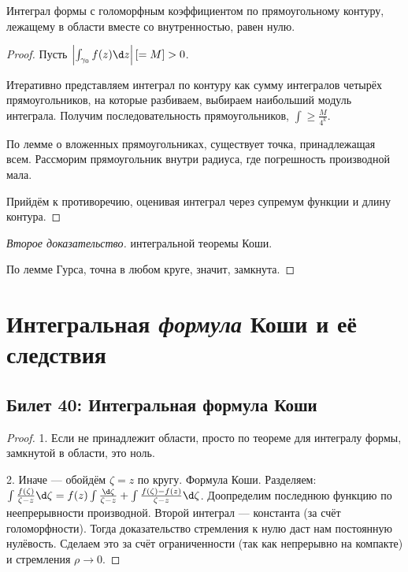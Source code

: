 \documentclass[12pt, a4paper, oneside]{memoir}
\begin{document}
\begin{lemma}
    [Э. Гурс]

    Интеграл формы с голоморфным коэффициентом по прямоугольному контуру,
    лежащему в области вместе со внутренностью, равен нулю.

    \begin{proof}
        Пусть $\left| \int_{\gamma_0} f(z) \d z \right| [= M] > 0$.

        Итеративно представляем интеграл по контуру как сумму интегралов четырёх прямоугольников, 
        на которые разбиваем, выбираем наибольший модуль интеграла. Получим последовательность прямоугольников, $\int \geqslant \frac{M}{4^k}$.

        По лемме о вложенных прямоугольниках, существует точка, принадлежащая всем. 
        Рассморим прямоугольник внутри радиуса, где погрешность производной мала.

        Прийдём к противоречию, оценивая интеграл через супремум функции и длину контура.
    \end{proof}
\end{lemma}

\begin{proof}
    [Второе доказательство] интегральной теоремы Коши.
    
    По лемме Гурса, точна в любом круге, значит, замкнута.
\end{proof}




\section{Интегральная \textit{формула} Коши и её следствия}

\subsection{Билет 40: Интегральная формула Коши}

\begin{theorem}

    \begin{proof}
        1. Если не принадлежит области, просто по теореме для интегралу формы, замкнутой в области, это ноль.

        2. Иначе — обойдём $\zeta = z$ по кругу. Формула Коши. Разделяем: $\int \frac{f(\zeta)}{\zeta - z} \d \zeta = f(z) \int \frac{\d \zeta}{\zeta - z} + \int \frac{f(\zeta) - f(z)}{\zeta - z} \d \zeta$. Доопределим последнюю функцию по неепрерывности производной.
        Второй интеграл — константа (за счёт голоморфности). Тогда доказательство стремления к нулю даст нам постоянную нулёвость. Сделаем это за счёт ограниченности (так как непрерывно на компакте) и стремления $\rho → 0$.
    \end{proof}
\end{theorem}
\end{document}
